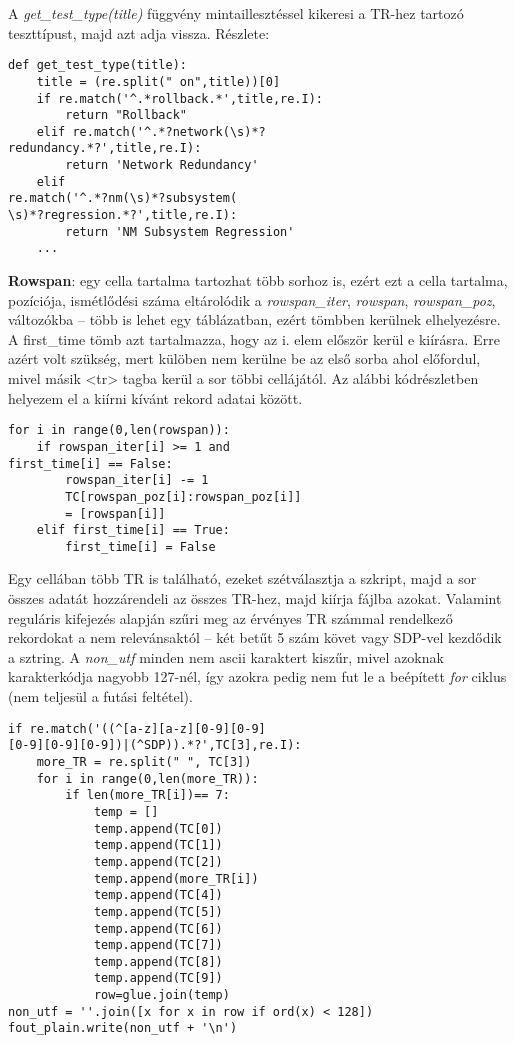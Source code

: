 \documentclass[a4paper,oneside,12pt]{article}
\begin{document}
A \emph{get\_test\_type(title)} függvény mintaillesztéssel kikeresi a TR-hez tartozó teszttípust, majd azt adja vissza. Részlete:
	\begin{lstlisting}
def get_test_type(title):
	title = (re.split(" on",title))[0]
	if re.match('^.*rollback.*',title,re.I):
		return "Rollback"
	elif re.match('^.*?network(\s)*?
redundancy.*?',title,re.I):
		return 'Network Redundancy'
	elif 
re.match('^.*?nm(\s)*?subsystem(
\s)*?regression.*?',title,re.I):
		return 'NM Subsystem Regression'
	...
	\end{lstlisting}
	
	\textbf{Rowspan}: egy cella tartalma tartozhat több sorhoz is, ezért ezt a cella tartalma, pozíciója, ismétlődési száma eltárolódik a \emph{rowspan\_iter}, \emph{rowspan}, \emph{rowspan\_poz}, változókba -- több is lehet egy táblázatban, ezért tömbben kerülnek elhelyezésre. A first\_time tömb azt tartalmazza, hogy az i. elem először kerül e kiírásra. Erre azért volt szükség, mert külöben nem kerülne be az első sorba ahol előfordul, mivel másik <tr> tagba kerül a sor többi cellájától. Az alábbi kódrészletben helyezem el a kiírni kívánt rekord adatai között.
%
\begin{lstlisting}
for i in range(0,len(rowspan)):
	if rowspan_iter[i] >= 1 and 
first_time[i] == False:
		rowspan_iter[i] -= 1
		TC[rowspan_poz[i]:rowspan_poz[i]] 
		= [rowspan[i]]
	elif first_time[i] == True:
		first_time[i] = False
\end{lstlisting}

	Egy cellában több TR is található, ezeket szétválasztja a szkript, majd a sor összes adatát hozzárendeli az összes TR-hez, majd kiírja fájlba azokat. Valamint reguláris kifejezés alapján szűri meg az érvényes TR számmal rendelkező rekordokat a nem relevánsaktól -- két betűt 5 szám követ vagy SDP-vel kezdődik a sztring. A \emph{non\_utf} minden nem ascii karaktert kiszűr, mivel azoknak karakterkódja nagyobb 127-nél, így azokra pedig nem fut le a beépített \emph{for} ciklus (nem teljesül a futási feltétel).
	\begin{lstlisting}
if re.match('((^[a-z][a-z][0-9][0-9]
[0-9][0-9][0-9])|(^SDP)).*?',TC[3],re.I):
	more_TR = re.split(" ", TC[3])
	for i in range(0,len(more_TR)):
		if len(more_TR[i])== 7:
			temp = []
			temp.append(TC[0])
			temp.append(TC[1])
			temp.append(TC[2])
			temp.append(more_TR[i])
			temp.append(TC[4])
			temp.append(TC[5])
			temp.append(TC[6])
			temp.append(TC[7])
			temp.append(TC[8])
			temp.append(TC[9])
			row=glue.join(temp)
non_utf = ''.join([x for x in row if ord(x) < 128])
fout_plain.write(non_utf + '\n')
	\end{lstlisting}
%
\end{document}
